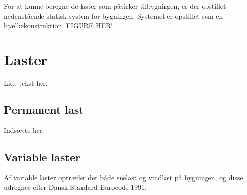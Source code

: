 For at kunne beregne de laster som påvirker tilbygningen, er der opstillet nedenstående statisk system for bygningen. Systemet er opstillet som en bjælkekonstruktion.
\newline
\newline
FIGURE HER!

\section{Laster}
Lidt tekst her.

\subsection{Permanent last}
Indsætte her.

\subsection{Variable laster}
Af variable laster optræder der både snelast og vindlast på bygningen, og disse udregnes efter Dansk Standard Eurocode 1991.

